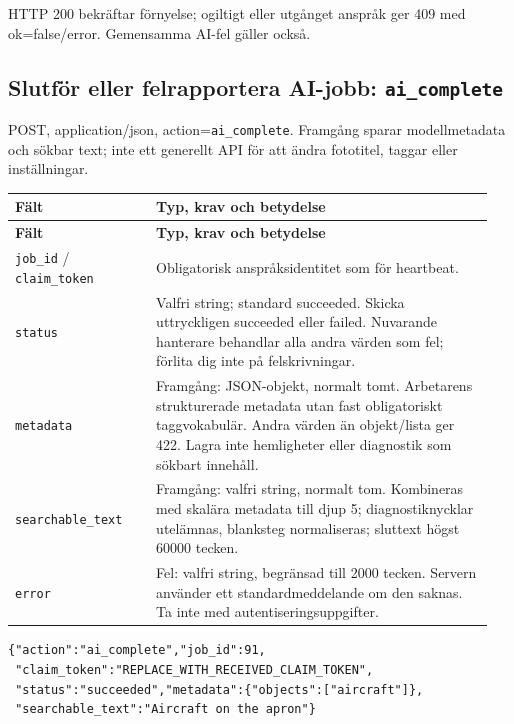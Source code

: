 \documentclass[11pt,a4paper]{article}
\newcommand{\codeword}[1]{\nolinkurl{#1}}
\begin{document}
HTTP 200 bekräftar förnyelse; ogiltigt eller utgånget anspråk ger 409 med ok=false/error.
Gemensamma AI-fel gäller också.

\subsection{\texorpdfstring{Slutför eller felrapportera AI-jobb: \codeword{ai_complete}}{Slutför eller felrapportera AI-jobb: ai\_complete}}

\label{api352:ai-complete}

POST, application/json, action=\codeword{ai_complete}. Framgång sparar modellmetadata och
sökbar text; inte ett generellt API för att ändra fototitel, taggar eller inställningar.

\begin{longtable}{@{}>{\RaggedRight\arraybackslash}p{0.28\linewidth}>{\RaggedRight\arraybackslash}p{0.67\linewidth}@{}}
\toprule
\textbf{Fält} & \textbf{Typ, krav och betydelse} \\
\midrule
\endfirsthead
\toprule
\textbf{Fält} & \textbf{Typ, krav och betydelse} \\
\midrule
\endhead
\bottomrule
\endfoot
\codeword{job_id} / \codeword{claim_token} & Obligatorisk anspråksidentitet som för
heartbeat. \\
\codeword{status} & Valfri string; standard succeeded. Skicka uttryckligen succeeded eller
failed. Nuvarande hanterare behandlar alla andra värden som fel; förlita dig inte på
felskrivningar. \\
\codeword{metadata} & Framgång: JSON-objekt, normalt tomt. Arbetarens strukturerade metadata
utan fast obligatoriskt taggvokabulär. Andra värden än objekt/lista ger 422. Lagra inte
hemligheter eller diagnostik som sökbart innehåll. \\
\codeword{searchable_text} & Framgång: valfri string, normalt tom. Kombineras med skalära
metadata till djup 5; diagnostiknycklar utelämnas, blanksteg normaliseras; sluttext högst
60000 tecken. \\
\codeword{error} & Fel: valfri string, begränsad till 2000 tecken. Servern använder ett
standardmeddelande om den saknas. Ta inte med autentiseringsuppgifter. \\
\end{longtable}

\begin{lstlisting}[language={}]
{"action":"ai_complete","job_id":91,
 "claim_token":"REPLACE_WITH_RECEIVED_CLAIM_TOKEN",
 "status":"succeeded","metadata":{"objects":["aircraft"]},
 "searchable_text":"Aircraft on the apron"}
\end{lstlisting}
\end{document}
